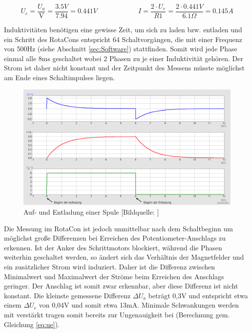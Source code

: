 \documentclass[11pt, titlepage]{report}
\begin{document}
				\begin{equation}
					\label{eq:ue}
					U_{e}=\frac{U_{a}}{\text{V}} = \frac{3.5V}{7.94} = 0.441V \hspace{6em} I=\frac{2\cdot U_{e}}{R1}=\frac{2\cdot 0.441V}{6.1\Omega}=0.145A
				\end{equation}

				Induktivitäten benötigen eine gewisse Zeit, um sich zu laden bzw. entladen und ein Schritt des RotaCons entspricht 64 Schaltvorgängen, die mit einer Frequenz von 500Hz (siehe Abschnitt \ref{sec:Software}) stattfinden. Somit wird jede Phase einmal alle 8ms geschaltet wobei 2 Phasen zu je einer Induktivität gehören. Der Strom ist daher nicht konstant und der Zeitpunkt des Messens müsste möglichst am Ende eines Schaltimpulses liegen.
				
				\vspace{1.5em}
				\begin{figure}[htbp]
					\label{fig:spule}
					\centering
					\includegraphics[width=0.7\linewidth]{img/Spule.png}
					\caption[Auf- und Entladung einer Spule]{Auf- und Entladung einer Spule [Bildquelle: \cite{Spule}]}
				\end{figure}	
				
				Die Messung im RotaCon ist jedoch unmittelbar nach dem Schaltbeginn um möglichst große Differenzen bei Erreichen des Potentiometer-Anschlags zu erkennen.
				\newline Ist der Anker des Schrittmotors blockiert, während die Phasen weiterhin geschaltet werden, so ändert sich das Verhältnis der Magnetfelder und ein zusätzlicher Strom wird induziert. Daher ist die Differenz zwischen Minimalwert und Maximalwert der Ströme beim Erreichen des Anschlags geringer. Der Anschlag ist somit zwar erkennbar,
				aber diese Differenz ist nicht konstant. Die kleinste gemessene Differenz $\Delta U_{a}$ beträgt 0,3V und entspricht etwa einem $\Delta U_{e}$ von 0,04V und somit etwa 13mA. Minimale Schwankungen werden mit verstärkt tragen somit bereits zur Ungenauigkeit bei (Berechnung gem. Gleichung \ref{eq:ue}).
			\newpage
\end{document}
